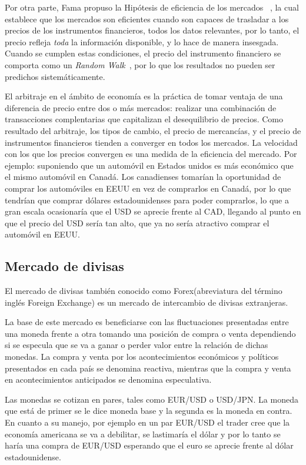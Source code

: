 Por otra parte, Fama propuso la Hipótesis de eficiencia de los mercados
~\cite{malkiel2012efficient}, la cual establece que los mercados son eficientes
cuando son capaces de trasladar a los precios de los instrumentos financieros,
todos los datos relevantes, por lo tanto, el precio refleja \emph{toda} la
información disponible, y lo hace de manera insesgada. Cuando se cumplen estas
condiciones, el precio del instrumento financiero se comporta como un
\emph{Random Walk}~\cite{fama1965random}, por lo que los resultados no pueden
ser predichos sistemáticamente.

El arbitraje en el ámbito de economía es la práctica de tomar ventaja de una
diferencia de precio entre dos o más mercados: realizar una combinación de
transacciones complentarias que capitalizan el desequilibrio de precios. Como
resultado del arbitraje, los tipos de cambio, el precio de mercancías, y el
precio de instrumentos financieros tienden a converger en todos los mercados.
La velocidad con los que los precios convergen es una medida de la eficiencia
del mercado. Por ejemplo: suponiendo que un automóvil en Estados unidos es más
económico que el mismo automóvil en Canadá. Los canadienses tomarían la
oportunidad de comprar los automóviles en EEUU en vez de comprarlos en Canadá,
por lo que tendrían que comprar dólares estadounidenses para poder comprarlos,
lo que a gran escala ocasionaría que el USD se aprecie frente al CAD, llegando
al punto en que el precio del USD sería tan alto, que ya no sería atractivo
comprar el automóvil en EEUU.

\subsection{Mercado de divisas}
El mercado de divisas también conocido como Forex(abreviatura del término
inglés Foreign Exchange) es un mercado de intercambio de divisas extranjeras.

La base de este mercado es beneficiarse con las fluctuaciones presentadas entre
una moneda frente a otra tomando una posición de compra o venta dependiendo si
se especula que se va a ganar o perder valor entre la relación de dichas
monedas. La compra y venta por los acontecimientos económicos y políticos
presentados en cada país se denomina reactiva, mientras que la compra y venta
en acontecimientos anticipados se denomina especulativa. 

Las monedas se cotizan en pares, tales como EUR/USD o USD/JPN. La moneda que
está de primer se le dice moneda base y la segunda es la moneda en contra. En
cuanto a su manejo, por ejemplo en un par EUR/USD el trader cree que la
economía americana se va a debilitar, se lastimaría el dólar y por lo tanto se
haría una compra de EUR/USD esperando que el euro se aprecie frente al dólar
estadounidense. 

